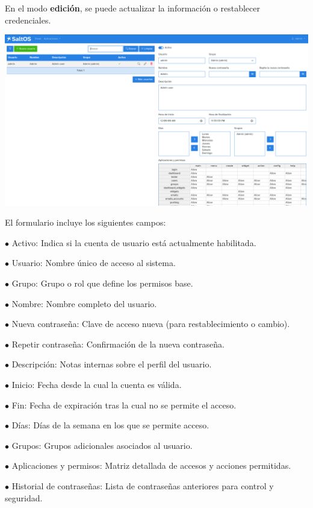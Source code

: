 \documentclass[a4paper]{article}
\begin{document}
En el modo \textbf{edición}, se puede actualizar la información o restablecer credenciales.

\begin{center}\includegraphics[width=1\textwidth]{../ujest/snaps/test-screenshots-js-screenshots-users-users-edit-1-es-es-1-snap.png}\end{center}

El formulario incluye los siguientes campos:

\begin{compactitem}
\item[\color{myblue}$\bullet$] Activo: Indica si la cuenta de usuario está actualmente habilitada.
\item[\color{myblue}$\bullet$] Usuario: Nombre único de acceso al sistema.
\item[\color{myblue}$\bullet$] Grupo: Grupo o rol que define los permisos base.
\item[\color{myblue}$\bullet$] Nombre: Nombre completo del usuario.
\item[\color{myblue}$\bullet$] Nueva contraseña: Clave de acceso nueva (para restablecimiento o cambio).
\item[\color{myblue}$\bullet$] Repetir contraseña: Confirmación de la nueva contraseña.
\item[\color{myblue}$\bullet$] Descripción: Notas internas sobre el perfil del usuario.
\item[\color{myblue}$\bullet$] Inicio: Fecha desde la cual la cuenta es válida.
\item[\color{myblue}$\bullet$] Fin: Fecha de expiración tras la cual no se permite el acceso.
\item[\color{myblue}$\bullet$] Días: Días de la semana en los que se permite acceso.
\item[\color{myblue}$\bullet$] Grupos: Grupos adicionales asociados al usuario.
\item[\color{myblue}$\bullet$] Aplicaciones y permisos: Matriz detallada de accesos y acciones permitidas.
\item[\color{myblue}$\bullet$] Historial de contraseñas: Lista de contraseñas anteriores para control y seguridad.
\end{compactitem}
\end{document}
